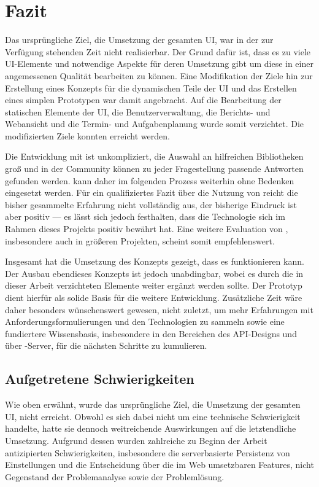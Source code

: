 \chapter{Fazit}\label{chap:conclusion}
Das ursprüngliche Ziel, die Umsetzung der gesamten UI, war in der zur Verfügung stehenden Zeit nicht realisierbar. Der Grund dafür ist, dass es zu viele UI-Elemente und notwendige Aspekte für deren Umsetzung gibt um diese in einer angemessenen Qualität bearbeiten zu können. Eine Modifikation der Ziele hin zur Erstellung eines Konzepts für die dynamischen Teile der  UI und das Erstellen eines simplen Prototypen war damit angebracht. Auf die Bearbeitung der statischen Elemente der UI, die Benutzerverwaltung, die Berichts- und Webansicht und die Termin- und Aufgabenplanung wurde somit verzichtet. Die modifizierten Ziele konnten erreicht werden.

Die Entwicklung mit  ist unkompliziert, die Auswahl an hilfreichen Bibliotheken groß und in der Community können zu jeder Fragestellung passende Antworten gefunden werden.  kann daher im folgenden Prozess weiterhin ohne Bedenken eingesetzt werden. Für ein qualifiziertes Fazit über die Nutzung von  reicht die bisher gesammelte Erfahrung nicht vollständig aus, der bisherige Eindruck ist aber positiv --- es lässt sich jedoch festhalten, dass die Technologie sich im Rahmen dieses Projekts positiv bewährt hat. Eine weitere Evaluation von , insbesondere auch in größeren Projekten, scheint somit empfehlenswert.

Insgesamt hat die Umsetzung des Konzepts gezeigt, dass es funktionieren kann. Der Ausbau ebendieses Konzepts ist jedoch unabdingbar, wobei es durch die in dieser Arbeit verzichteten Elemente weiter ergänzt werden sollte. Der Prototyp dient hierfür als solide Basis für die weitere Entwicklung. Zusätzliche Zeit wäre daher besonders wünschenswert gewesen, nicht zuletzt, um mehr Erfahrungen mit Anforderungsformulierungen und den Technologien zu sammeln sowie eine fundiertere Wissensbasis, insbesondere in den Bereichen des API-Designs und über -Server, für die nächsten Schritte zu kumulieren.

\section{Aufgetretene Schwierigkeiten}
Wie oben erwähnt, wurde das ursprüngliche Ziel, die Umsetzung der gesamten UI, nicht erreicht. Obwohl es sich dabei nicht um eine technische Schwierigkeit handelte, hatte sie dennoch weitreichende Auswirkungen auf die letztendliche Umsetzung. Aufgrund dessen wurden zahlreiche zu Beginn der Arbeit antizipierten Schwierigkeiten, insbesondere die serverbasierte Persistenz von Einstellungen und die Entscheidung über die im Web umsetzbaren Features, nicht Gegenstand der Problemanalyse sowie der Problemlösung.

